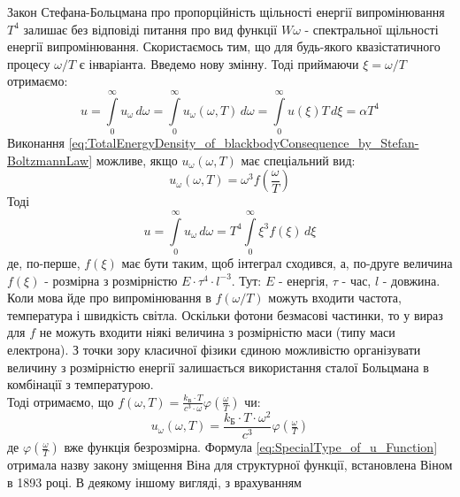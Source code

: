 \documentclass{article}
\begin{document}
\Task{}Закон Стефана-Больцмана про пропорційність щільності енергії випромінювання $T^{4}$ залишає без відповіді питання про вид функції $W\omega$ - спектральної щільності енергії випромінювання. Скористаємось тим, що для 
будь-якого квазістатичного процесу $\omega/T$ є інваріанта. Введемо нову змінну. Тоді приймаючи $\xi = \omega/T$ отримаємо: 
\begin{equation}
    \label{eq:TotalEnergyDensity_of_blackbodyConsequence_by_Stefan-BoltzmannLaw}
    u = \int\limits_{0}^{\infty} u_{\omega} \, d\omega = \int\limits_{0}^{\infty} u_{\omega}(\omega, T) \, d\omega = 
    \int\limits_{0}^{\infty} u(\xi) T \, d\xi = \alpha T^{4}
\end{equation}
Виконання \eqref{eq:TotalEnergyDensity_of_blackbodyConsequence_by_Stefan-BoltzmannLaw} можливе, якщо $u_{\omega}(\omega, T)$ має спеціальний вид: 
\begin{equation}
    \label{eq:SpecialType_of_u_Function}
    u_{\omega}(\omega, T) = \omega^{3} f(\frac{\omega}{T})
\end{equation}
Тоді
\begin{equation}
    \label{eq:TotalEnergyDensity_of_blackbodyConsequence_by_Stefan-BoltzmannLawFinal}
    u = \int\limits_{0}^{\infty} u_{\omega} \, d\omega = T^{4} \int\limits_{0}^{\infty} \xi^{3} f(\xi) \, d\xi
\end{equation}
де, по-перше, $f(\xi)$ має бути таким, щоб інтеграл сходився, а, по-друге величина $f(\xi)$ - розмірна з розмірністю $E \cdot \tau^{4} \cdot l^{-3}$. Тут: $E$ - енергія, $\tau$ - час, $l$ - довжина. Коли мова йде про випромінювання 
в $f(\omega/T)$ можуть входити частота, температура і швидкість світла. Оскільки фотони безмасові частинки, то у вираз для $f$ не можуть входити ніякі величина з розмірністю маси (типу маси електрона). З точки зору класичної фізики 
єдиною можливістю організувати величину з розмірністю енергії залишається використання сталої Больцмана в комбінації  з температурою. \vspace{5mm} \\
Тоді отримаємо, що $f(\omega, T) = \frac{k_{\text{Б}} \cdot T}{c^{3} \cdot \omega} \varphi(\tfrac{\omega}{T})$ чи: 
\begin{equation}
    \label{eq:SpectralDensity_of_Radiation_Energy}
    u_{\omega}(\omega, T) = \frac{k_{\text{Б}} \cdot T \cdot \omega^{2}}{c^{3}} \varphi(\tfrac{\omega}{T})
\end{equation}
де $\varphi(\tfrac{\omega}{T})$ вже функція безрозмірна. Формула \eqref{eq:SpecialType_of_u_Function} отримала назву закону зміщення Віна для структурної функції, встановлена Віном в 1893 році. В деякому іншому вигляді, з врахуванням 
\end{document}
